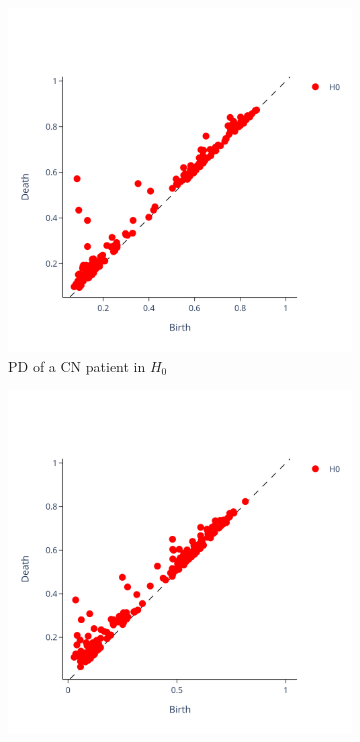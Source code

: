 \documentclass{article}
\begin{document}
\begin{figure}[htb]
  \centering
  \centering
  \begin{subfigure}{0.32\textwidth}
    \includegraphics[width=\textwidth]{figures/PDs/persistence_diagram_CN_H_0.png}
    \caption{PD of a CN patient in $H_0$}
  \end{subfigure}
  \begin{subfigure}{0.32\textwidth}
    \includegraphics[width=\textwidth]{figures/PDs/persistence_diagram_MCI_H_0.png}

\end{subfigure}
\end{figure}
\end{document}
